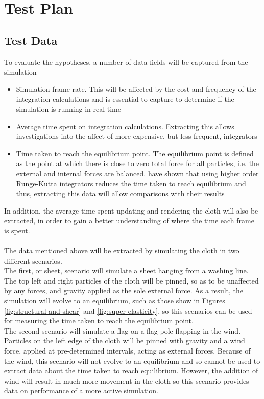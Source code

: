 \chapter{Test Plan}

\section{Test Data}
To evaluate the hypotheses, a number of data fields will be captured from the simulation
\begin{itemize}
\item{Simulation frame rate. This will be affected by the cost and frequency of the integration calculations and is essential to capture to determine if the simulation is running in real time}
\item{Average time spent on integration calculations. Extracting this allows investigations into the affect of more expensive, but less frequent, integrators}
\item{Time taken to reach the equilibrium point. The equilibrium point is defined as the point at which there is close to zero total force for all particles, i.e. the external and internal forces are balanced. \textcite{Wang2009a} have shown that using higher order Runge-Kutta integrators reduces the time taken to reach equilibrium and thus, extracting this data will allow comparisons with their results}
\end{itemize}
In addition, the average time spent updating and rendering the cloth will also be extracted, in order to gain a better understanding of where the time each frame is spent.
\\\\The data mentioned above will be extracted by simulating the cloth in two different scenarios.
\\The first, or sheet, scenario will simulate a sheet hanging from a washing line. The top left and right particles of the cloth will be pinned, so as to be unaffected by any forces, and gravity applied as the sole external force. As a result, the simulation will evolve to an equilibrium, such as those show in Figures \ref{fig:structural and shear} and \ref{fig:super-elasticity}, so this scenarios can be used for measuring the time taken to reach the equilibrium point. 
\\The second scenario will simulate a flag on a flag pole flapping in the wind. Particles on the left edge of the cloth will be pinned with gravity and a wind force, applied at pre-determined intervals, acting as external forces. Because of the wind, this scenario will not evolve to an equilibrium and so cannot be used to extract data about the time taken to reach equilibrium. However, the addition of wind will result in much more movement in the cloth so this scenario provides data on performance of a more active simulation.


